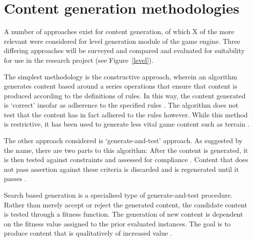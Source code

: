 \documentclass[11pt, a4paper, oneside]{report} %
\begin{document}
\section{Content generation methodologies}

A number of approaches exist for content generation, of which X of the more
relevant were considered for level generation module of the game engine. Three
differing approaches will be surveyed and compared and evaluated for suitability
for use in the research project (see Figure~\ref{level}).

The simplest methodology is the constructive approach, wherein an algorithm
generates content based around a series operations that ensure that content is
produced according to the definitions of rules. In this way, the content
generated is `correct' insofar as adherence to the specified rules
\cite{browne2008automatic}. The algorithm does not test that the content has in
fact adhered to the rules however. While this method is restrictive, it has been
used to generate less vital game content such as terrain
\cite{Miller:1986:DRT:15886.15890}.

The other approach considered is `generate-and-test' approach. As suggested by
the name, there are two parts to this algorithm: After the content is generated,
it is then tested against constraints and assessed for compliance
\cite{5756645}. Content that does not pass assertion against these criteria is
discarded and is regenerated until it passes \cite{5756645}.

Search based generation is a specialised type of generate-and-test procedure.
Rather than merely accept or reject the generated content, the candidate content
is tested through a fitness function. The generation of new content is dependent
on the fitness value assigned to the prior evaluated instances. The goal is to
produce content that is qualitatively of increased value \cite{5756645}.



\end{document}
